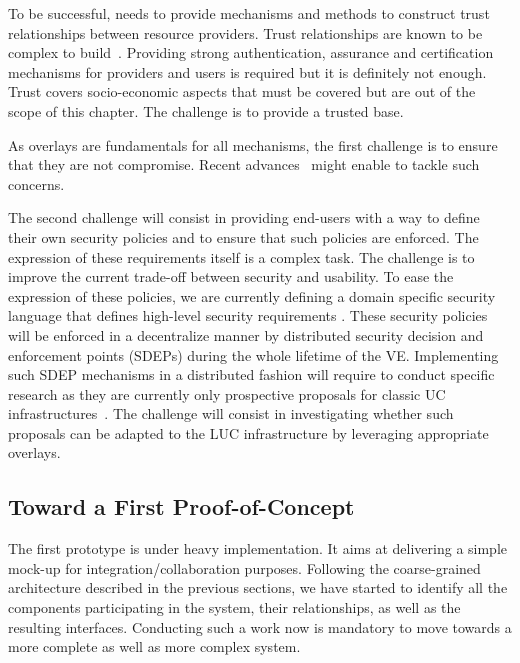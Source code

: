 To be successful, \discovery needs to provide mechanisms and methods to construct trust relationships between resource providers.
Trust relationships are known to be complex to build~\cite{Miller:2010:TWT:1907636.1907726}. Providing strong authentication, assurance and certification mechanisms for 
providers and users is required but it is definitely not enough. Trust covers socio-economic aspects that must be covered but are out of the scope of this chapter.
The challenge is to provide a trusted \discovery base.

As overlays are fundamentals for all \discovery mechanisms, the first challenge is to ensure
that they are not compromise. Recent advances~\cite{Castro:2002:SRS:844128.844156} might enable to tackle such concerns.

The second challenge will consist in providing end-users with a way to define their own  security policies and to ensure that such policies are enforced. 
The expression of these requirements itself is a complex task.
The challenge is to improve the current trade-off between security and usability.
To ease the expression of these policies, we are currently defining a  domain specific security language
that defines high-level security requirements \cite{rouzaud_book13b,alefray:hpdc:2013}. 
These security policies will be enforced in a decentralize manner
by distributed security decision and enforcement points (SDEPs) during the whole lifetime of the VE.
Implementing such SDEP mechanisms in a distributed fashion will require to
conduct specific research as they are currently only prospective proposals for
classic UC infrastructures~\cite{Bacon:2010:EEA:2023718.2023739,sandhu_towards_2010}. 
The challenge will consist in investigating whether such proposals can be adapted to the LUC
infrastructure by leveraging appropriate overlays.


\subsection{Toward a First Proof-of-Concept}

The first prototype is under heavy implementation. It aims at delivering a
simple mock-up for integration/collaboration purposes.  Following the
coarse-grained architecture described in the previous sections, we have
started to identify all the components participating in the system, their
relationships, as well as the resulting interfaces. 
Conducting such a work now is mandatory to move towards a more complete as well
as more complex system. 

